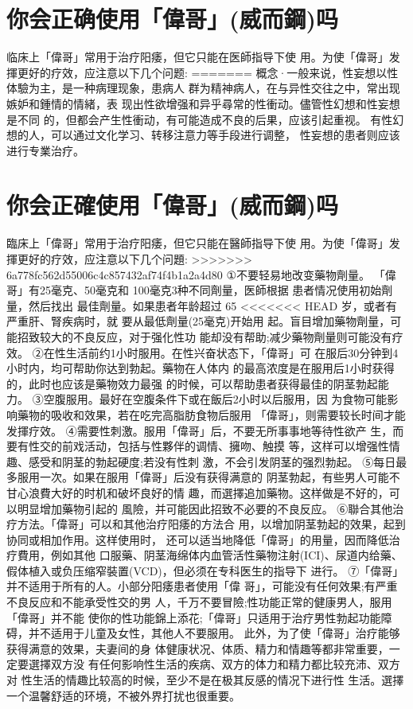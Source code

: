 \documentclass[12pt,UTF8]{ctexbook}
\begin{document}
\section{你会正确使用「偉哥」(威而鋼)吗}

临床上「偉哥」常用于治疗阳痿，但它只能在医師指导下使
用。为使「偉哥」发揮更好的疗效，应注意以下几个问题:
=======
概念·一般来说，性妄想以性体驗为主，是一种病理现象，患病人
群为精神病人，在与异性交往之中，常出现嫉妒和鍾情的情緒，表
现出性欲增强和异乎尋常的性衝动。儘管性幻想和性妄想是不同
的，但都会产生性衝动，有可能造成不良的后果，应该引起重视。
有性幻想的人，可以通过文化学习、转移注意力等手段进行调整，
性妄想的患者则应该进行专業治疗。

\section{你会正確使用「偉哥」(威而鋼)吗}

臨床上「偉哥」常用于治疗阳痿，但它只能在醫師指导下使
用。为使「偉哥」发揮更好的疗效，应注意以下几个问題:
>>>>>>> 6a778fc562d55006c4c857432af74f4b1a2a4d80
①不要轻易地改变藥物劑量。
「偉哥」有25毫克、50毫克和
100毫克3种不同劑量，医師根据
患者情况使用初始劑量，然后找出
最佳劑量。如果患者年龄超过 65
<<<<<<< HEAD
岁，或者有严重肝、腎疾病时，就
要从最低劑量(25毫克)开始用
起。盲目增加藥物劑量，可能招致较大的不良反应，对于强化性功
能却没有帮助;减少藥物劑量则可能没有疗效。
②在性生活前约1小时服用。在性兴奋状态下，「偉哥」可
在服后30分钟到4小时内，均可帮助你达到勃起。藥物在人体内
的最高浓度是在服用后1小时获得的，此时也应该是藥物效力最强
的时候，可以帮助患者获得最佳的阴茎勃起能力。
③空腹服用。最好在空腹条件下或在飯后2小时以后服用，因
为食物可能影响藥物的吸收和效果，若在吃完高脂肪食物后服用
「偉哥」，则需要较长时间才能发揮疗效。
④需要性刺激。服用「偉哥」后，不要无所事事地等待性欲产
生，而要有性交的前戏活动，包括与性夥伴的调情、擁吻、触摸
等，这样可以增强性情趣、感受和阴茎的勃起硬度;若没有性刺
激，不会引发阴茎的强烈勃起。
⑤每日最多服用一次。如果在服用「偉哥」后没有获得满意的
阴茎勃起，有些男人可能不甘心浪費大好的时机和破坏良好的情
趣，而選擇追加藥物。这样做是不好的，可以明显增加藥物引起的
風險，并可能因此招致不必要的不良反应。
⑥聯合其他治疗方法。「偉哥」可以和其他治疗阳痿的方法合
用，以增加阴茎勃起的效果，起到协同或相加作用。这样使用时，
还可以适当地降低「偉哥」的用量，因而降低治疗費用，例如其他
口服藥、阴茎海绵体内血管活性藥物注射(ICI)、尿道内给藥、
假体植入或负压缩窄裝置(VCD)，但必须在专科医生的指导下
进行。
⑦「偉哥」并不适用于所有的人。小部分阳痿患者使用「偉
哥」，可能没有任何效果;有严重不良反应和不能承受性交的男
人，千万不要冒險;性功能正常的健康男人，服用「偉哥」并不能
使你的性功能錦上添花;「偉哥」只适用于治疗男性勃起功能障
碍，并不适用于儿童及女性，其他人不要服用。
此外，为了使「偉哥」治疗能够获得满意的效果，夫妻间的身
体健康状况、体质、精力和情趣等都非常重要，一定要選擇双方没
有任何影响性生活的疾病、双方的体力和精力都比较充沛、双方对
性生活的情趣比较高的时候，至少不是在极其反感的情况下进行性
生活。選擇一个温馨舒适的环境，不被外界打扰也很重要。
\end{document}
